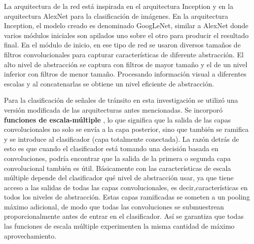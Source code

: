	La arquitectura de la red está inspirada en el arquitectura Inception \citep{Inception} y en la arquitectura AlexNet\citep{Krizhevsky2012} para la clasificación de imágenes. En la arquitectura Inception, el modelo creado es denominado GoogLeNet, similar a AlexNet donde varios módulos iniciales son apilados uno sobre el otro para producir el resultado final. En el módulo de inicio, en ese tipo de red se usaron diversos tamaños de filtros convolucionales para capturar características de diferente abstracción. El alto nivel de abstracción se captura con filtros de mayor tamaño y el de un nivel inferior con filtros de menor tamaño. Procesando información visual a diferentes escalas y al concatenarlas se obtiene un nivel eficiente de abstracción. 

	Para la clasificación de señales de tránsito en esta investigación se utilizó una versión modificada de las arquitecturas antes mencionadas. Se incorporó {\bf funciones de escala-múltiple} \citep{Multi_scale_feat}, lo que significa que la salida de las capas convolucionales no solo se envía a la capa posterior, sino que también se ramifica y se introduce al clasificador (capa totalmente conectada). La razón detrás de esto es que cuando el clasificador está tomando una decisión basada en convoluciones, podría encontrar que la salida de la primera o segunda capa convolucional también es útil. Básicamente con las características de escala múltiple depende del clasificador qué nivel de abstracción usar, ya que tiene acceso a las salidas de todas las capas convolucionales, es decir,características en todos los niveles de abstracción. Estas capas ramificadas se someten a un pooling máximo adicional, de modo que todas las convoluciones se submuestrean proporcionalmente antes de entrar en el clasificador. Así se garantiza que todas las funciones de escala múltiple experimenten la misma cantidad de máximo aprovechamiento.
	

